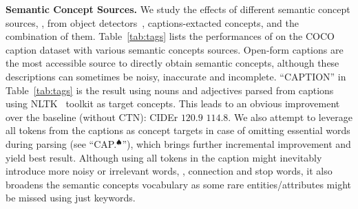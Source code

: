 \vspace{1mm}
\noindent \textbf{Semantic Concept Sources.} We study the effects of different semantic concept sources, \ie, from object detectors~\citep{anderson2018bottom,zhang2021multi}, captions-extacted concepts, and the combination of them. Table~\ref{tab:tags} lists the performances of \vitcap on the COCO caption dataset with various semantic concepts sources. 
Open-form captions are the most accessible source to directly obtain semantic concepts, although these descriptions can sometimes be noisy, inaccurate and incomplete. ``CAPTION'' in Table~\ref{tab:tags} is the result using nouns and adjectives parsed from captions using NLTK~\citep{loper2002nltk} toolkit as target concepts. This leads to an obvious improvement over the baseline (without CTN): CIDEr $120.9$ \vs $114.8$. 
We also attempt to leverage all tokens from the captions as concept targets in case of omitting essential words during parsing (see ``CAP.$^{\spadesuit}$''), which brings further incremental improvement and yield best result. Although using all tokens in the caption might inevitably introduce more noisy or irrelevant words, \eg, connection and stop words, it also broadens the semantic concepts vocabulary as some rare entities/attributes might be missed using just keywords. 


